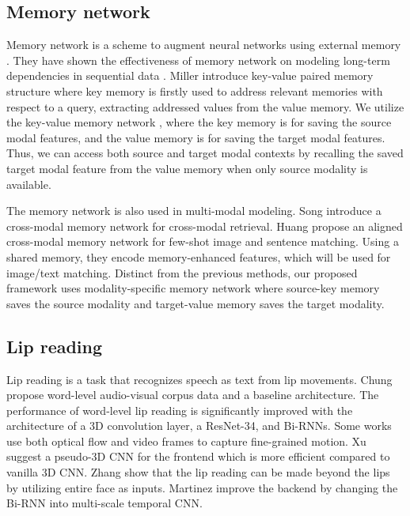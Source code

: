 \documentclass[10pt,twocolumn,letterpaper]{article}
\begin{document}
\subsection{Memory network}
Memory network is a scheme to augment neural networks using external memory \cite{weston2014memory, sukhbaatar2015endmem}. They have shown the effectiveness of memory network on modeling long-term dependencies in sequential data \cite{lee2021videomemory}. Miller \etal \cite{miller2016keyvalue} introduce key-value paired memory structure where key memory is firstly used to address relevant memories with respect to a query, extracting addressed values from the value memory. 
We utilize the key-value memory network \cite{miller2016keyvalue}, where the key memory is for saving the source modal features, and the value memory is for saving the target modal features. Thus, we can access both source and target modal contexts by recalling the saved target modal feature from the value memory when only source modality is available.

The memory network is also used in multi-modal modeling. Song \etal \cite{song2018cmmn} introduce a cross-modal memory network for cross-modal retrieval. 
Huang \etal \cite{huang2019acmm} propose an aligned cross-modal memory network for few-shot image and sentence matching. 
Using a shared memory, they encode memory-enhanced features, which will be used for image/text matching. Distinct from the previous methods, our proposed framework uses modality-specific memory network where source-key memory saves the source modality and target-value memory saves the target modality.

\subsection{Lip reading}
Lip reading is a task that recognizes speech as text from lip movements. Chung \etal \cite{chung2016lrw} propose word-level audio-visual corpus data and a baseline architecture. The performance of word-level lip reading is significantly improved with the architecture \cite{stafylakis2017reslstm, petridis2018end} of a 3D convolution layer, a ResNet-34, and Bi-RNNs. Some works \cite{weng2019twostream, xiao2020deformation} use both optical flow and video frames to capture fine-grained motion. Xu \etal \cite{xu2020discriminative} suggest a pseudo-3D CNN for the frontend which is more efficient compared to vanilla 3D CNN. Zhang \etal \cite{zhang2020cutout} show that the lip reading can be made beyond the lips by utilizing entire face as inputs. Martinez \etal \cite{martinez2020mstcn} improve the backend by changing the Bi-RNN into multi-scale temporal CNN.
\end{document}
